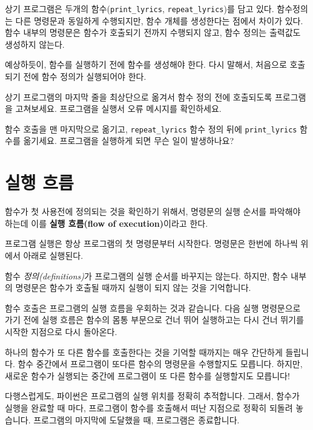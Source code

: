 상기 프로그램은 두개의 함수(\verb"print_lyrics", \verb"repeat_lyrics")를 담고 있다.
함수정의는 다른 명령문과 동일하게 수행되지만, 함수 개체를 생성한다는 점에서 차이가 있다.
함수 내부의 명령문은 함수가 호출되기 전까지 수행되지 않고, 함수 정의는 출력값도 생성하지 않는다.


예상하듯이, 함수를 실행하기 전에 함수를 생성해야 한다. 다시 말해서, 처음으로 호출되기 전에
함수 정의가 실행되어야 한다.

\begin{ex}
상기 프로그램의 마지막 줄을 최상단으로 옮겨서 함수 정의 전에 호출되도록 프로그램을 고쳐보세요.
프로그램을 실행서 오류 메시지를 확인하세요.
\end{ex}

\begin{ex}
함수 호출을 맨 마지막으로 옮기고, \verb"repeat_lyrics" 함수 정의 뒤에 \verb"print_lyrics" 함수를 옮기세요.
프로그램을 실행하게 되면 무슨 일이 발생하나요?
\end{ex}


\section{실행 흐름}

함수가 첫 사용전에 정의되는 것을 확인하기 위해서, 명령문의 실행 순서를 파악해야 하는데 이를 {\bf 실행 흐름(flow of execution)}이라고 한다.

프로그램 실행은 항상 프로그램의 첫 명령문부터 시작한다. 명령문은 한번에 하나씩 위에서 아래로 실행된다.

함수 \emph{정의(definitions)}가 프로그램의 실행 순서를 바꾸지는 않는다. 하지만, 함수 내부의 명령문은 함수가 호출될 때까지 실행이 되지 않는 것을 기억합니다. 

함수 호출은 프로그램의 실행 흐름을 우회하는 것과 같습니다. 다음 실행 명령문으로 가기 전에 실행 흐름은 함수의 몸통 부문으로 건너 뛰어 실행하고는 다시 건너 뛰기를 
시작한 지점으로 다시 돌아온다.

하나의 함수가 또 다른 함수를 호출한다는 것을 기억할 때까지는 매우 간단하게 들립니다.
함수 중간에서 프로그램이 또다른 함수의 명령문을 수행할지도 모릅니다. 하지만, 새로운 함수가 실행되는 중간에 프로그램이 또 다른 함수를 실행할지도 모릅니다!
 
다행스럽게도, 파이썬은 프로그램의 실행 위치를 정확히 추적합니다. 그래서, 함수가 실행을 완료할 때 마다, 프로그램이 함수를 호출해서 떠난 지점으로 정확히 되돌려 놓습니다. 프로그램의 마지막에 도달했을 때, 프로그램은 종료합니다.

